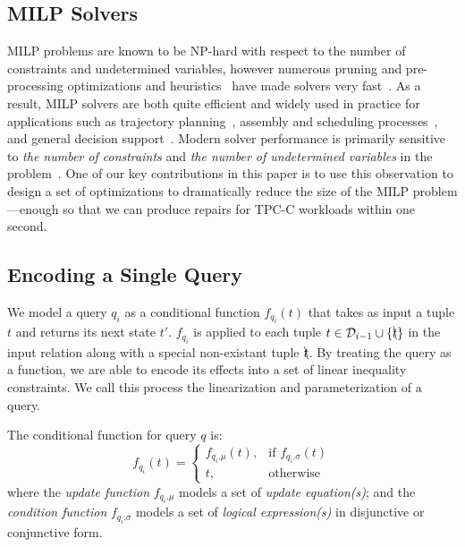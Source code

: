 \subsection{MILP Solvers}
\label{sec:MILP}

MILP problems are known to be NP-hard with respect to the number of constraints and undetermined variables, however numerous pruning and pre-processing optimizations and heuristics~\cite{lima2011computational} have made solvers very fast~\cite{quesada1992lp,stubbs1999branch,savelsbergh1994preprocessing,danna2005exploring,rothberg2007evolutionary,achterberg2009scip}.  
As a result, MILP solvers are both quite efficient and widely used in practice for applications such as trajectory planning~\cite{Ma2006, Richards02_JGCD, Kuwata2005a}, assembly and scheduling processes~\cite{Floudas2005, Sawik2011, Sawik2000}, and general decision support~\cite{Sabater2009, Milan2013}.
Modern solver performance is primarily sensitive to \textit{the number of constraints} and \textit{the number of undetermined variables} in the problem~\cite{atamturk2005integer,meindl2012analysis,gearhart2013comparison}. 
One of our key contributions in this paper is to use this observation to design a set of optimizations to dramatically reduce the size of the MILP problem---enough so that we can produce repairs for TPC-C workloads within one second.


\subsection{Encoding a Single Query}
\label{sec:linearize}

  We model a query $q_i$ as a conditional function $f_{q_i}(t)$ that takes as input a tuple $t$
  and returns its next state $t'$.  $f_{q_i}$ is applied to each 
  tuple $t \in \mathcal{D}_{i-1} \cup \{\bcancel{t}\}$ in the input relation along with a special
  non-existant tuple $\bcancel{t}$. 
  By treating the query as a function, we are able to encode its effects into a set
  of linear inequality constraints.  We call this process the linearization and 
  parameterization of a query.

  \begin{definition} 
  \label{def:cond}
    The conditional function for query $q$ is:
    \[
      f_{q_i}(t)= 
      \begin{cases}
      f_{q_i.\mu} (t) ,& \text{if } f_{q_i.\sigma} (t)\\
      t,              & \text{otherwise}
      \end{cases}
  \]
  where the \textit{update function} $f_{q_i.\mu}$ models a set of \textit{update equation(s)};
  and the \textit{condition function} $f_{q_i.\sigma}$ models a set of \textit{logical expression(s)} in 
  disjunctive or conjunctive form.
  \end{definition} 



